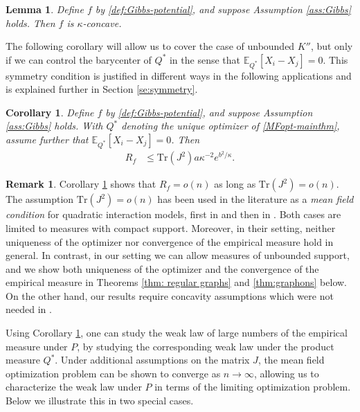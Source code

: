 \documentclass[11pt,reqno]{amsart}
\numberwithin{equation}{section}
\newtheorem{lemma}[theorem]{Lemma}
\newtheorem{corollary}[theorem]{Corollary}
\theoremstyle{definition}
\newtheorem{remark}[theorem]{Remark}
\def\E{{\mathbb E}}
\def\tr{{\mathrm{Tr}}}
\begin{document}
\begin{lemma} \label{lem: gibbs-log-concave}
	Define $f$ by \eqref{def:Gibbs-potential}, and suppose Assumption \ref{ass:Gibbs} holds. Then $f$ is $\kappa$-concave. 
\end{lemma}


	The following corollary will allow us to cover the case of unbounded $K''$, but only if we can control the barycenter of $Q^*$ in the sense that $\E_{Q^*}[X_i-X_j]=0$. This symmetry condition is justified in different ways in the following applications and is explained further in Section \ref{se:symmetry}. 
	
	\begin{corollary}\label{cor:quadratic}
		Define $f$ by \eqref{def:Gibbs-potential}, and suppose Assumption \ref{ass:Gibbs} holds.
		With $Q^*$ denoting the unique optimizer of \eqref{MFopt-mainthm}, assume further that $\E_{Q^*}[X_i-X_j]=0$. 
		Then 
		\begin{align*}
			R_f &\le \tr(J^2) a \kappa^{-2} e^{b^2/\kappa} .
		\end{align*}
	\end{corollary}



\begin{remark}\label{ref:compare}
	Corollary \ref{cor:quadratic} shows that $R_f=o(n)$ as long as $\mathrm{Tr}(J^2)=o(n)$.
	The assumption $\mathrm{Tr}(J^2)=o(n)$ has been used in the literature as a \emph{mean field condition} for quadratic interaction models, first in \cite[Theorem  1.1]{basak-mukherjee} and then in \cite[Theorem 4]{yan2020nonlinear}. Both cases are limited to measures with compact support. Moreover, in their setting, neither uniqueness of the optimizer nor convergence of the empirical measure hold in general. In contrast, in our setting we can allow measures of unbounded support, and we show both uniqueness of the optimizer and the convergence of the empirical measure in Theorems \ref{thm: regular graphs} and \ref{thm:graphons} below. On the other hand, our results require concavity assumptions which were not needed in \cite{basak-mukherjee,yan2020nonlinear}. 
\end{remark}



Using Corollary \ref{cor:quadratic}, one can study the weak law of large numbers of the empirical measure under $P$, by studying the corresponding weak law under the product measure $Q^*$. Under additional assumptions on the matrix $J$, the mean field optimization problem can be shown to converge as $n\to\infty$, allowing us to characterize the weak law under $P$ in terms of the limiting optimization problem. Below we illustrate this in two special cases.
\end{document}
